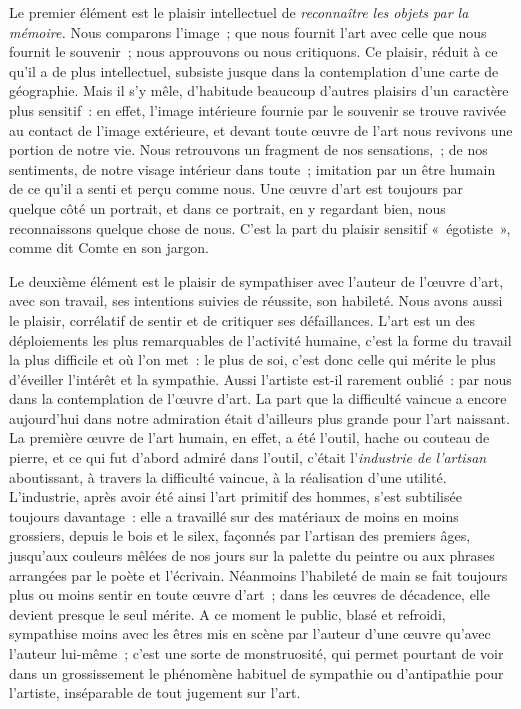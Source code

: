 \documentclass[french,twoside]{book} %
\begin{document}
Le premier élément est le plaisir intellectuel de \emph{reconnaître les objets par la mémoire.} Nous comparons l’image ; que nous fournit l’art avec celle que nous fournit le souvenir ; nous approuvons ou nous critiquons. Ce plaisir, réduit à ce qu’il a de plus intellectuel, subsiste jusque dans la contemplation d’une carte de géographie. Mais il s’y mêle, d’habitude beaucoup d’autres plaisirs d’un caractère plus sensitif : en effet, l’image intérieure fournie par le souvenir se trouve ravivée au contact de l’image extérieure, et devant toute œuvre de l’art nous revivons une portion de notre vie. Nous retrouvons un fragment de nos sensations, ; de nos sentiments, de notre visage intérieur dans toute ; imitation par un être humain de ce qu’il a senti et perçu comme nous. Une œuvre d’art est toujours par quelque côté un portrait, et dans ce portrait, en y regardant bien, nous reconnaissons quelque chose de nous. C’est la part du plaisir sensitif « égotiste », comme dit Comte en son jargon.\par
Le deuxième élément est le plaisir de sympathiser avec l’auteur de l’œuvre d’art, avec son travail, ses intentions suivies de réussite, son habileté. Nous avons aussi le plaisir, corrélatif de sentir et de critiquer ses défaillances. L’art est un des déploiements les plus remarquables de l’activité humaine, c’est la forme du travail la plus difficile et où l’on met : le plus de soi, c’est donc celle qui mérite le plus d’éveiller l’intérêt et la sympathie. Aussi l’artiste est-il rarement oublié : par nous dans la contemplation de l’œuvre d’art. La part que la difficulté vaincue a encore aujourd’hui dans notre admiration était d’ailleurs plus grande pour l’art naissant. La première œuvre de l’art humain, en effet, a été l’outil, hache ou couteau de pierre, et ce qui fut d’abord admiré dans l’outil, c’était l’\emph{industrie de l’artisan} aboutissant, à travers la difficulté vaincue, à la réalisation d’une utilité. L’industrie, après avoir été ainsi l’art primitif des hommes, s’est subtilisée toujours davantage : elle a travaillé sur des matériaux de moins en moins grossiers, depuis le bois et le silex, façonnés par l’artisan des premiers âges, jusqu’aux couleurs mêlées de nos jours sur la palette du peintre ou aux phrases arrangées par le poète et l’écrivain. Néanmoins l’habileté de main se fait toujours plus ou moins sentir en toute œuvre d’art ; dans les œuvres de décadence, elle devient presque le seul mérite. A ce moment le public, blasé et refroidi, sympathise moins avec les êtres mis en scène par l’auteur d’une œuvre qu’avec l’auteur lui-même ; c’est une sorte de monstruosité, qui permet pourtant de voir dans un grossissement le phénomène habituel de sympathie ou d’antipathie pour l’artiste, inséparable de tout jugement sur l’art.\par
\end{document}
